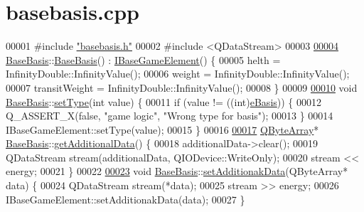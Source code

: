 \hypertarget{a00026_source}{}\section{basebasis.\+cpp}
\label{a00026_source}

\begin{DoxyCode}
00001 \textcolor{preprocessor}{#}\textcolor{preprocessor}{include} \hyperlink{a00029}{"basebasis.h"}
00002 \textcolor{preprocessor}{#}\textcolor{preprocessor}{include} \textcolor{preprocessor}{<}\textcolor{preprocessor}{QDataStream}\textcolor{preprocessor}{>}
00003 
\hyperlink{a00149_aa3c0b1cd0f29db8b63bb22dbfb78bbc5}{00004} \hyperlink{a00149}{BaseBasis}::\hyperlink{a00149_aa3c0b1cd0f29db8b63bb22dbfb78bbc5}{BaseBasis}() : \hyperlink{a00137_ae2be75da1a2a9edfabe993770e24654a}{IBaseGameElement}() \{
00005   helth = InfinityDouble::InfinityValue();
00006   weight = InfinityDouble::InfinityValue();
00007   transitWeight = InfinityDouble::InfinityValue();
00008 \}
00009 
\hyperlink{a00149_ac31b2ea48f47f1bc2baaf1971243b506}{00010} \textcolor{keywordtype}{void} \hyperlink{a00149}{BaseBasis}::\hyperlink{a00149_ac31b2ea48f47f1bc2baaf1971243b506}{setType}(\textcolor{keywordtype}{int} value) \{
00011   \textcolor{keywordflow}{if} (value != ((\textcolor{keywordtype}{int})\hyperlink{a00047_a5afb9d86324dabec6a0c73f9b6aa1bafa18b2b8475de0a17c5561231466d40c7d}{eBasis})) \{
00012     Q\_ASSERT\_X(\textcolor{keyword}{false}, \textcolor{stringliteral}{"game logic"}, \textcolor{stringliteral}{"Wrong type for basis"});
00013   \}
00014   IBaseGameElement::setType(value);
00015 \}
00016 
\hyperlink{a00149_aaf8b691c26fbbda7878c22dfda32ebe4}{00017} \hyperlink{a00149_aaf8b691c26fbbda7878c22dfda32ebe4}{QByteArray}* \hyperlink{a00149}{BaseBasis}::\hyperlink{a00149_aaf8b691c26fbbda7878c22dfda32ebe4}{getAdditionalData}() \{
00018   additionalData->clear();
00019   QDataStream stream(additionalData, QIODevice::WriteOnly);
00020   stream << energy;
00021 \}
00022 
\hyperlink{a00149_a17b5facef5ea0c9bb9c558a90831d6f9}{00023} \textcolor{keywordtype}{void} \hyperlink{a00149}{BaseBasis}::\hyperlink{a00149_a17b5facef5ea0c9bb9c558a90831d6f9}{setAdditionakData}(QByteArray* data) \{
00024   QDataStream stream(*data);
00025   stream >> energy;
00026   IBaseGameElement::setAdditionakData(data);
00027 \}
\end{DoxyCode}
